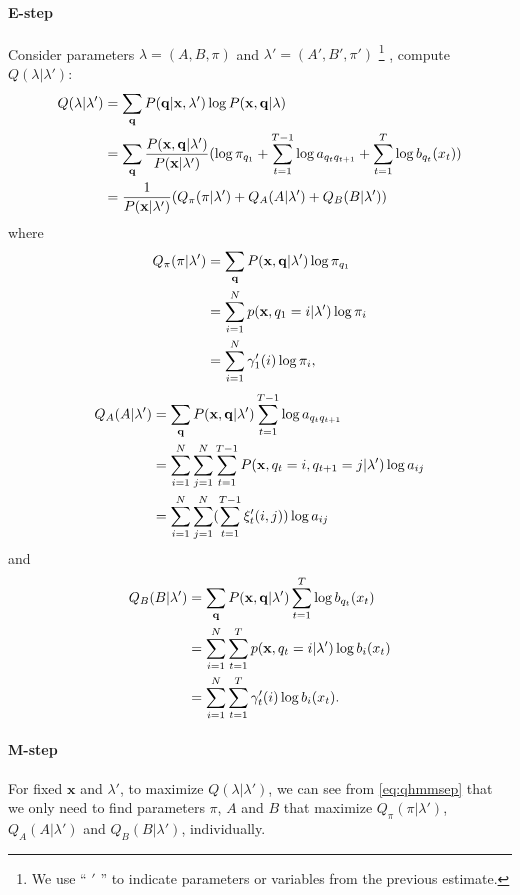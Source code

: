 \documentclass[12pt,final,twoside]{report}
\begin{document}
\paragraph{E-step}
Consider parameters $\lambda=(A,B,\pi)$ and $\lambda'=(A',B',\pi')$ 
\footnote{We use `` $'$ '' to indicate parameters or variables from the previous estimate.}
, compute $Q(\lambda|\lambda')$:
\begin{align}
  Q(\lambda|\lambda') &= \sum_{\mathbf{q}} P(\mathbf{q}|\mathbf{x},\lambda') \log P(\mathbf{x},\mathbf{q}|\lambda) \notag\\
  &= \sum_{\mathbf{q}} \frac{P(\mathbf{x},\mathbf{q}|\lambda')}{P(\mathbf{x}|\lambda')} 
  (\log \pi_{q_1} + \sum_{t=1}^{T-1} \log a_{q_t q_{t+1}} + \sum_{t=1}^{T} \log b_{q_t}(x_t) ) \notag\\
  &= \frac{1}{P(\mathbf{x}|\lambda')} (Q_\pi(\pi|\lambda') + Q_A(A|\lambda') + Q_B(B|\lambda'))
  \label{eq:qhmmsep}
\end{align}
where
\begin{align}
  Q_\pi(\pi|\lambda') &= \sum_{\mathbf{q}} P(\mathbf{x},\mathbf{q}|\lambda') \log \pi_{q_1}  \notag\\
  &= \sum_{i=1}^{N} p(\mathbf{x},q_1=i|\lambda') \log \pi_{i} \notag\\
  &= \sum_{i=1}^{N} \gamma'_1(i) \log \pi_{i},
\end{align}
\begin{align}
  Q_A(A|\lambda') &= \sum_{\mathbf{q}} P(\mathbf{x},\mathbf{q}|\lambda') \sum_{t=1}^{T-1} \log a_{q_t q_{t+1}} \notag\\
  &= \sum_{i=1}^{N} \sum_{j=1}^{N} \sum_{t=1}^{T-1} P(\mathbf{x},q_t=i,q_{t+1}=j|\lambda') \log a_{ij} \notag\\
  &= \sum_{i=1}^{N} \sum_{j=1}^{N} (\sum_{t=1}^{T-1} \xi'_t(i, j)) \log a_{ij}
\end{align}
and
\begin{align}
  Q_B(B|\lambda') &= \sum_{\mathbf{q}} P(\mathbf{x},\mathbf{q}|\lambda') \sum_{t=1}^{T} \log b_{q_t}(x_t) \notag\\
  &= \sum_{i=1}^{N} \sum_{t=1}^{T} p(\mathbf{x},q_t=i|\lambda') \log b_{i}(x_t) \notag\\
  &= \sum_{i=1}^{N} \sum_{t=1}^{T} \gamma'_t(i) \log b_{i}(x_t) .
  \label{eq:qhmmb}
\end{align}

\paragraph{M-step}
For fixed $\mathbf{x}$ and $\lambda'$, to maximize $Q(\lambda|\lambda')$, we can see from \cref{eq:qhmmsep} that we only need to find parameters $\pi$, $A$ and $B$ that maximize $Q_\pi(\pi|\lambda')$, $Q_A(A|\lambda')$ and $Q_B(B|\lambda')$, individually.
\end{document}
